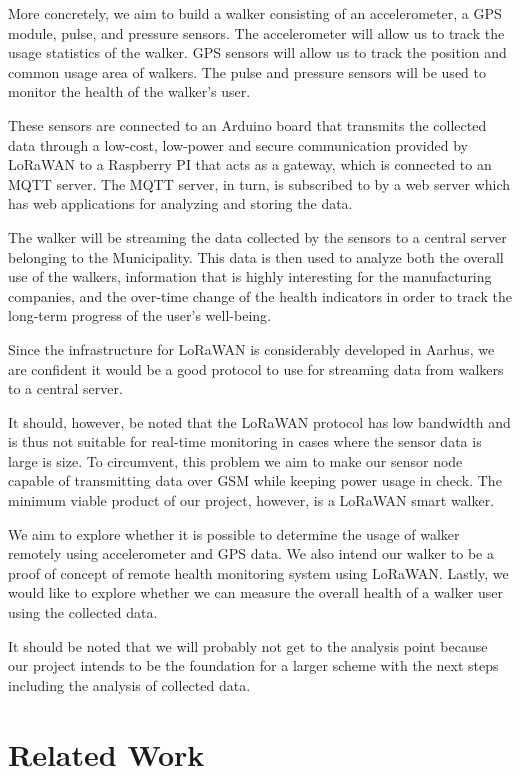 \documentclass[conference]{IEEEtran}
\begin{document}
More concretely, we aim to build a walker consisting of an accelerometer, a GPS module, pulse, and pressure sensors. The accelerometer will allow us to track the usage statistics of the walker. GPS sensors will allow us to track the position and common usage area of walkers. The pulse and pressure sensors will be used to monitor the health of the walker's user.


These sensors are connected to an Arduino board that transmits the collected data through a low-cost, low-power and secure communication provided by LoRaWAN to a Raspberry PI that acts as a gateway, which is connected to an MQTT server. The MQTT server, in turn, is subscribed to by a web server which has web applications for analyzing and storing the data.


The walker will be streaming the data collected by the sensors to a central server belonging to the Municipality. This data is then used to analyze both the overall use of the walkers, information that is highly interesting for the manufacturing companies, and the over-time change of the health indicators in order to track the long-term progress of the user's well-being.

Since the infrastructure for LoRaWAN is considerably developed in Aarhus, we are confident it would be a good protocol to use for streaming data from walkers to a central server.

It should, however, be noted that the LoRaWAN protocol has low bandwidth and is thus not suitable for real-time monitoring in cases where the sensor data is large is size. To circumvent, this problem we aim to make our sensor node capable of transmitting data over GSM while keeping power usage in check. The minimum viable product of our project, however, is a LoRaWAN smart walker.

We aim to explore whether it is possible to determine the usage of walker remotely using accelerometer and GPS data. We also intend our walker to be a proof of concept of remote health monitoring system using LoRaWAN. Lastly, we would like to explore whether we can measure the overall health of a walker user using the collected data.

It should be noted that we will probably not get to the analysis point because our project intends to be the foundation for a larger scheme with the next steps including the analysis of collected data.


\section{Related Work}
\end{document}
